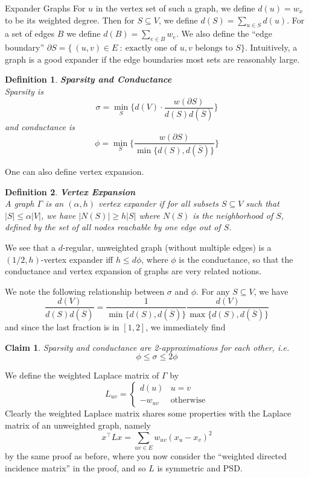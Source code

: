 \documentclass{article}
\newtheorem{claim}{Claim}
\newtheorem{defn}{Definition}
\begin{document}
\begin{section}{Expander Graphs}
   For $u$ in the vertex set of such a graph, we define $d(u) = w_x$ to be its weighted degree.
   Then for $S \subseteq V$, we define $d(S) = \sum_{u \in S}{d(u)}$.
   For a set of edges $B$ we define $d(B) = \sum_{e \in B}w_e$.
   We also define the ``edge boundary'' $\partial S = \{~(u,v) \in E~:~\text{exactly one of $u,v$ belongs to $S$}\}$.
   Intuitively, a graph is a good expander if the edge boundaries most sets are reasonably large.

   \begin{defn}{\textbf{Sparsity and Conductance}\\}
     Sparsity is 
     $$\sigma = \min_{S}\bigg\{d(V) \cdot \frac{w(\partial S)}{d(S)d(\overline S)}\bigg\}$$
     and conductance is
     $$
     \phi = \min_S\bigg\{\frac{w(\partial S)}{\min\{d(S),d(\overline S)\}}\bigg\}
     $$
   \end{defn}

   One can also define vertex expansion.
   \begin{defn}{\textbf{Vertex Expansion}\\}
     A graph $\Gamma$ is an $(\alpha, h)$ vertex expander if for all subsets $S \subseteq V$ such that $|S| \leq \alpha |V|$, we have $|N(S)| \geq h|S|$ where $N(S)$ is the neighborhood of $S$, defined by the set of all nodes reachable by one edge out of $S$.
   \end{defn}

   We see that a $d$-regular, unweighted graph (without multiple edges) is a $(1/2,h)$-vertex expander iff $h \leq d\phi$, where $\phi$ is the conductance, so that the conductance and vertex expansion of graphs are very related notions.

   We note the following relationship between $\sigma$ and $\phi$.
   For any $S \subseteq V$, we have
   $$
   \frac{d(V)}{d(S)d(\overline S)} = \frac{1}{\min\{d(S),d(\overline S)\}}\frac{d(V)}{\max\{d(S),d(\overline S)\}}
   $$
   and since the last fraction is in $[1,2]$, we immediately find
   \begin{claim}
   Sparsity and conductance are 2-approximations for each other, i.e.
   $$
   \phi \leq \sigma \leq 2\phi
   $$
   \end{claim}
   We define the weighted Laplace matrix of $\Gamma$ by
   $$L_{uv} = \begin{cases} d(u) & u = v \\ -w_{uv} & \text{otherwise} \end{cases} $$
   Clearly the weighted Laplace matrix shares some properties with the Laplace matrix of an unweighted graph, namely
   $$
   x^\intercal L x = \sum_{uv \in E} w_{uv}(x_u - x_v)^2
   $$
   by the same proof as before, where you now consider the ``weighted directed incidence matrix'' in the proof, and so $L$ is symmetric and PSD.


\end{section}
\end{document}

